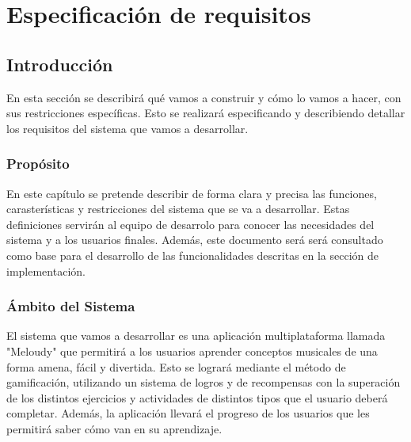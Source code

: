 \chapter{Especificación de requisitos}


\section{Introducción}
En esta sección se describirá qué vamos a construir y cómo lo vamos a hacer, 
con sus restricciones específicas. Esto se realizará especificando y describiendo
 detallar los requisitos del sistema que vamos a desarrollar. 

\subsection{Propósito}
En este capítulo se pretende describir de forma clara y precisa las funciones, carasterísticas y restricciones
del sistema que se va a desarrollar. Estas definiciones servirán al equipo de desarrolo para
conocer las necesidades del sistema y a los usuarios finales. Además, este documento será será consultado como
base para el desarrollo de las funcionalidades descritas en la sección de implementación.

\subsection{Ámbito del Sistema}
El sistema que vamos a desarrollar es una aplicación multiplataforma llamada "Meloudy" que permitirá a los usuarios
aprender conceptos musicales de una forma amena, fácil y divertida. Esto se logrará mediante el método de gamificación,
utilizando un sistema de logros y de recompensas con la superación de los distintos ejercicios y actividades de distintos tipos que el usuario deberá completar.
Además, la aplicación llevará el progreso de los usuarios que les permitirá saber cómo van en su aprendizaje.

